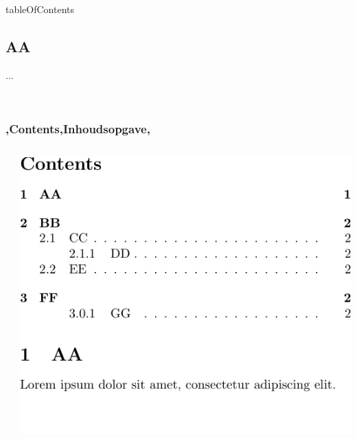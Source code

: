 
\begin{saveblock}{tableOfContents}
    \begin{highlightblock}[linewidth=0.5\textwidth,gobble=8]
        
            \maketitle
            \tableofcontents

            \section{AA}
            ...
        
        ~~
        ~~
        ~~
        ~~
        ~~
        ~~
        ~~
        ~~
    \end{highlightblock}
\end{saveblock}


\begin{frame}
    \frametitle{\lang,Contents,Inhoudsopgave,}
    
    \begin{columns}
        \begin{column}{0.5\textwidth}
        \end{column}
        \begin{column}{0.5\textwidth}
            \includegraphics[width=\linewidth,height=0.8\textheight,keepaspectratio,page=1]{assets/tableofcontents.pdf}
        \end{column}
    \end{columns}
\end{frame}

